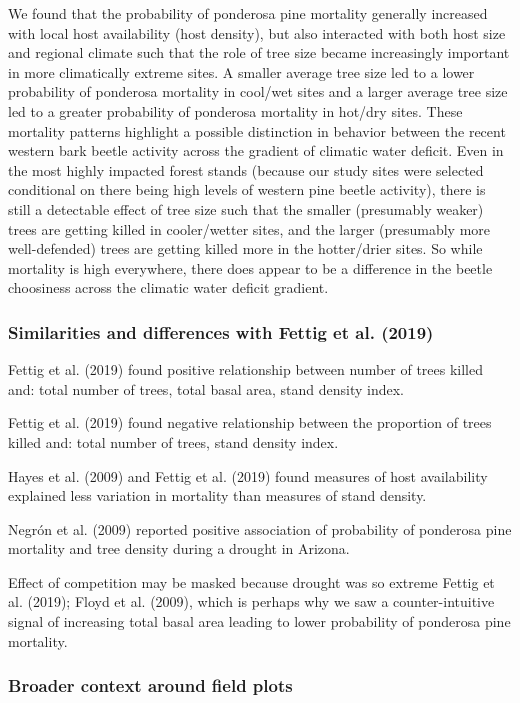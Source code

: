\documentclass[]{article}
\begin{document}
We found that the probability of ponderosa pine mortality generally
increased with local host availability (host density), but also
interacted with both host size and regional climate such that the role
of tree size became increasingly important in more climatically extreme
sites. A smaller average tree size led to a lower probability of
ponderosa mortality in cool/wet sites and a larger average tree size led
to a greater probability of ponderosa mortality in hot/dry sites. These
mortality patterns highlight a possible distinction in behavior between
the recent western bark beetle activity across the gradient of climatic
water deficit. Even in the most highly impacted forest stands (because
our study sites were selected conditional on there being high levels of
western pine beetle activity), there is still a detectable effect of
tree size such that the smaller (presumably weaker) trees are getting
killed in cooler/wetter sites, and the larger (presumably more
well-defended) trees are getting killed more in the hotter/drier sites.
So while mortality is high everywhere, there does appear to be a
difference in the beetle choosiness across the climatic water deficit
gradient.

\subsubsection{Similarities and differences with Fettig et al.
(2019)}\label{similarities-and-differences-with-fettig2019}

Fettig et al. (2019) found positive relationship between number of trees
killed and: total number of trees, total basal area, stand density
index.

Fettig et al. (2019) found negative relationship between the proportion
of trees killed and: total number of trees, stand density index.

Hayes et al. (2009) and Fettig et al. (2019) found measures of host
availability explained less variation in mortality than measures of
stand density.

Negrón et al. (2009) reported positive association of probability of
ponderosa pine mortality and tree density during a drought in Arizona.

Effect of competition may be masked because drought was so extreme
Fettig et al. (2019); Floyd et al. (2009), which is perhaps why we saw a
counter-intuitive signal of increasing total basal area leading to lower
probability of ponderosa pine mortality.

\subsubsection{Broader context around field
plots}\label{broader-context-around-field-plots}
\end{document}
